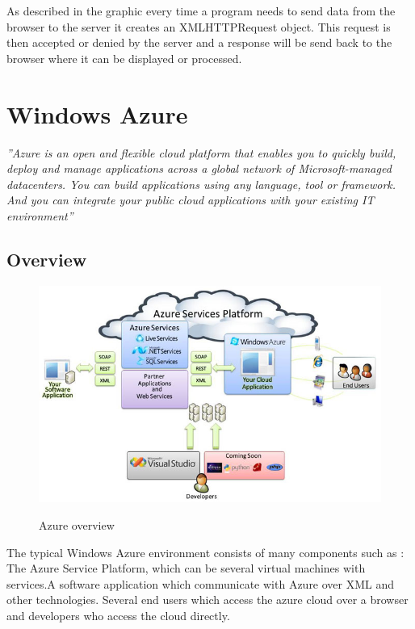 As described in the graphic every time a program needs to send data from the browser to the server it creates an XMLHTTPRequest object. This request is then accepted or denied by the server and a response will be send back to the browser where it can be displayed or processed. 

\section{Windows Azure}
\textit{''Azure is an open and flexible cloud platform that enables you to quickly build, deploy and manage applications across a global network of Microsoft-managed datacenters. You can build applications using any language, tool or framework. And you can integrate your public cloud applications with your existing IT environment''}\cite{azure}
\subsection{Overview}
\begin{figure}[htbp]
\centering
\includegraphics[width=\textwidth,height=\textheight,keepaspectratio]{graphics/azurePlattform.jpg}
\caption{Azure overview}\cite{azureOver}
\end{figure}

The typical Windows Azure environment consists of many components such as : The Azure Service Platform, which can be several virtual machines with services.A software application which communicate with Azure over XML and other technologies. Several end users which access the azure cloud over a browser and developers who access the cloud directly. 
\newpage
